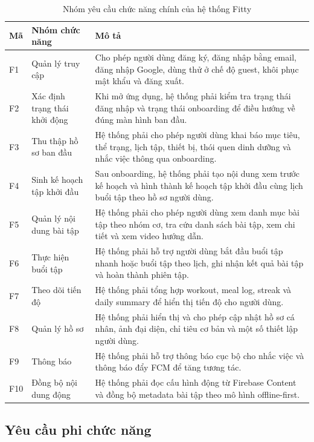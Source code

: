 \begin{table}[H]
\centering
\caption{Nhóm yêu cầu chức năng chính của hệ thống Fitty}
\begin{tabular}{|p{1.5cm}|p{4.3cm}|p{7.2cm}|}
\hline
\textbf{Mã} & \textbf{Nhóm chức năng} & \textbf{Mô tả} \\ \hline
F1 & Quản lý truy cập & Cho phép người dùng đăng ký, đăng nhập bằng email, đăng nhập Google, dùng thử ở chế độ guest, khôi phục mật khẩu và đăng xuất. \\ \hline
F2 & Xác định trạng thái khởi động & Khi mở ứng dụng, hệ thống phải kiểm tra trạng thái đăng nhập và trạng thái onboarding để điều hướng về đúng màn hình ban đầu. \\ \hline
F3 & Thu thập hồ sơ ban đầu & Hệ thống phải cho phép người dùng khai báo mục tiêu, thể trạng, lịch tập, thiết bị, thói quen dinh dưỡng và nhắc việc thông qua onboarding. \\ \hline
F4 & Sinh kế hoạch tập khởi đầu & Sau onboarding, hệ thống phải tạo nội dung xem trước kế hoạch và hình thành kế hoạch tập khởi đầu cùng lịch buổi tập theo hồ sơ người dùng. \\ \hline
F5 & Quản lý nội dung bài tập & Hệ thống phải cho phép người dùng xem danh mục bài tập theo nhóm cơ, tra cứu danh sách bài tập, xem chi tiết và xem video hướng dẫn. \\ \hline
F6 & Thực hiện buổi tập & Hệ thống phải hỗ trợ người dùng bắt đầu buổi tập nhanh hoặc buổi tập theo lịch, ghi nhận kết quả bài tập và hoàn thành phiên tập. \\ \hline
F7 & Theo dõi tiến độ & Hệ thống phải tổng hợp workout, meal log, streak và daily summary để hiển thị tiến độ cho người dùng. \\ \hline
F8 & Quản lý hồ sơ & Hệ thống phải hiển thị và cho phép cập nhật hồ sơ cá nhân, ảnh đại diện, chỉ tiêu cơ bản và một số thiết lập người dùng. \\ \hline
F9 & Thông báo & Hệ thống phải hỗ trợ thông báo cục bộ cho nhắc việc và thông báo đẩy FCM để tăng tương tác. \\ \hline
F10 & Đồng bộ nội dung động & Hệ thống phải đọc cấu hình động từ Firebase Content và đồng bộ metadata bài tập theo mô hình offline-first. \\ \hline
\end{tabular}
\end{table}

\subsection{Yêu cầu phi chức năng}

